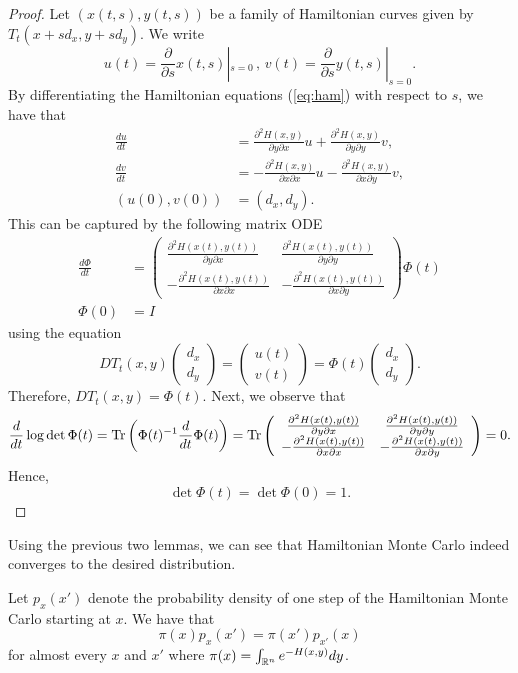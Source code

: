 \begin{proof}
Let $(x(t,s),y(t,s))$ be a family of Hamiltonian curves given by
$T_{t}(x+sd_{x},y+sd_{y})$. We write 
\[
u(t)=\frac{\partial}{\partial s}x(t,s)|_{s=0}\,,\,v(t)=\frac{\partial}{\partial s}y(t,s)|_{s=0}.
\]
By differentiating the Hamiltonian equations (\ref{eq:ham}) with
respect to $s$, we have that
\begin{align*}
\frac{du}{dt} & =\frac{\partial^{2}H(x,y)}{\partial y\partial x}u+\frac{\partial^{2}H(x,y)}{\partial y\partial y}v,\\
\frac{dv}{dt} & =-\frac{\partial^{2}H(x,y)}{\partial x\partial x}u-\frac{\partial^{2}H(x,y)}{\partial x\partial y}v,\\
(u(0),v(0)) & =(d_{x},d_{y}).
\end{align*}
This can be captured by the following matrix ODE
\begin{align*}
\frac{d\Phi}{dt} & =\left(\begin{array}{cc}
\frac{\partial^{2}H(x(t),y(t))}{\partial y\partial x} & \frac{\partial^{2}H(x(t),y(t))}{\partial y\partial y}\\
-\frac{\partial^{2}H(x(t),y(t))}{\partial x\partial x} & -\frac{\partial^{2}H(x(t),y(t))}{\partial x\partial y}
\end{array}\right)\Phi(t)\\
\Phi(0) & =I
\end{align*}
using the equation
\[
DT_{t}(x,y)\left(\begin{array}{c}
d_{x}\\
d_{y}
\end{array}\right)=\left(\begin{array}{c}
u(t)\\
v(t)
\end{array}\right)=\Phi(t)\left(\begin{array}{c}
d_{x}\\
d_{y}
\end{array}\right).
\]
Therefore, $DT_{t}(x,y)=\Phi(t)$. Next, we observe that
\[
\frac{d}{dt}\log\det\Phi(t)=\mathrm{Tr}\left(\Phi(t)^{-1}\frac{d}{dt}\Phi(t)\right)=\mathrm{Tr}\left(\begin{array}{cc}
\frac{\partial^{2}H(x(t),y(t))}{\partial y\partial x} & \frac{\partial^{2}H(x(t),y(t))}{\partial y\partial y}\\
-\frac{\partial^{2}H(x(t),y(t))}{\partial x\partial x} & -\frac{\partial^{2}H(x(t),y(t))}{\partial x\partial y}
\end{array}\right)=0.
\]
Hence,
\[
\det\Phi(t)=\det\Phi(0)=1.
\]
\end{proof}
Using the previous two lemmas, we can see that Hamiltonian Monte Carlo
indeed converges to the desired distribution. 
\begin{lem}
\label{lem:time_reversibility}Let $p_{x}(x')$ denote the probability
density of one step of the Hamiltonian Monte Carlo starting at $x$.
We have that\textup{
\[
\pi(x)p_{x}(x')=\pi(x')p_{x'}(x)
\]
for almost every $x$ and $x'$ where $\pi(x)=\int_{\mathbb{R}^{n}}e^{-H(x,y)}dy$.}
\end{lem}

